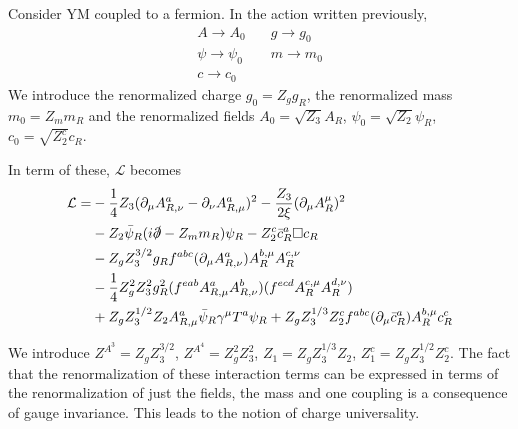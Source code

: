 \documentclass[a4paper]{book}
\theoremstyle{definition}
\theoremstyle{remark}
\begin{document}
Consider YM coupled to a fermion. In the action written previously, 
\begin{equation}
    \begin{aligned}
        A\rightarrow A_0 &\quad g \rightarrow g_0 \\ 
        \psi \rightarrow\psi_0 &\quad m \rightarrow m_0 \\ 
        c \rightarrow c_0 &
    \end{aligned}
\end{equation}
We introduce the renormalized charge $g_0 = Z_g g_R$, the renormalized mass $m_0 = Z_m m_R$ and the renormalized fields $A_0 = \sqrt{Z_3}A_R$, $\psi_0 = \sqrt{Z_2}\psi_R$, $c_0 = \sqrt{Z_2^c}c_R$. \par \medskip 

In term of these, $\mathcal L$ becomes 
\begin{equation}
    \begin{aligned}
        \mathcal L =& -\frac{1}{4}Z_3 (\partial_\mu A^a_{R,\nu} - \partial_\nu A^a_{R, \mu})^2 - \frac{Z_3}{2\xi}(\partial_\mu A^\mu_R)^2 \\ 
        &- Z_2 \bar \psi_R (i\slashed{\partial} - Z_m m_R)\psi_R - Z_2^c \bar{c}_R^a \square c_R \\ 
        &- Z_g Z_3^{3/2}g_R f^{abc}(\partial_\mu A^a_{R,\nu}) A^{b,\mu}_R A^{c,\nu}_R \\ 
        &-\frac{1}{4}Z^2_g Z^2_3 g^2_R (f^{eab}A^a_{R,\mu} A^b_{R,\nu})(f^{ecd} A^{c,\mu}_R A^{d,\nu}_R) \\ 
        &+ Z_g Z^{1/2}_3 Z_2 A^a_{R,\mu} \bar \psi_R \gamma^\mu T^a \psi_R + Z_g Z^{1/3}_3 Z^c_2 f^{abc}(\partial_\mu \bar c^a_R) A^{b,\mu}_R c^c_R
    \end{aligned}
\end{equation}

We introduce $Z^{A^3} = Z_g Z_3^{3/2}$, $Z^{A^4} = Z_g^2 Z_3^2$, $Z_1 = Z_gZ_3^{1/3}Z_2$, $Z^c_1 = Z_gZ_3^{1/2}Z^c_2$. The fact that the renormalization of these interaction terms can be expressed in terms of the renormalization of just the fields, the mass and one coupling is a consequence of gauge invariance. This leads to the notion of charge universality. \par \medskip 
\end{document}
